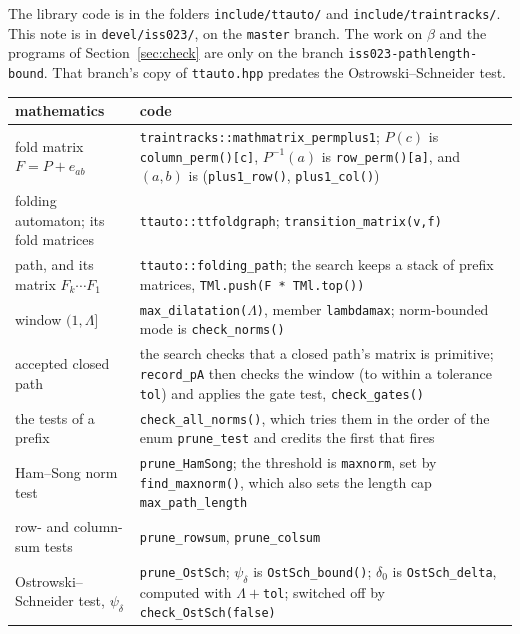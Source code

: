 \documentclass[11pt]{amsart}
\newcommand{\code}[1]{\texttt{#1}}
\newcommand{\Lam}{\Lambda}
\theoremstyle{plain}
\theoremstyle{definition}
\begin{document}
The library code is in the folders \code{include/ttauto/} and
\code{include/traintracks/}.  This note is in \code{devel/iss023/}, on
the \code{master} branch.  The work on $\beta$ and the programs of
Section~\ref{sec:check} are only on the branch
\code{iss023-pathlength-bound}.  That branch's copy of \code{ttauto.hpp}
predates the Ostrowski--Schneider test.

\begin{center}
  \small
  \begin{tabular}{>{\raggedright\arraybackslash}p{}
                  >{\raggedright\arraybackslash}p{}}
    \toprule
    mathematics & code \\
    \midrule
    fold matrix $F=P+e_{ab}$ &
      \code{traintracks::mathmatrix\_permplus1}; $P(c)$ is
      \code{column\_perm()[c]}, $P^{-1}(a)$ is \code{row\_perm()[a]}, and
      $(a,b)$ is (\code{plus1\_row()}, \code{plus1\_col()}) \\
    folding automaton; its fold matrices &
      \code{ttauto::ttfoldgraph}; \code{transition\_matrix(v,f)} \\
    path, and its matrix $F_k\cdots F_1$ &
      \code{ttauto::folding\_path}; the search keeps a stack of prefix
      matrices, \code{TMl.push(F * TMl.top())} \\
    window $(1,\Lam]$ & \code{max\_dilatation(}$\Lam$\code{)}, member
      \code{lambdamax}; norm-bounded mode is \code{check\_norms()} \\
    accepted closed path & the search checks that a closed path's matrix
      is primitive; \code{record\_pA} then checks the window (to within a
      tolerance \code{tol}) and applies the gate test,
      \code{check\_gates()} \\
    the tests of a prefix & \code{check\_all\_norms()}, which tries them in
      the order of the enum \code{prune\_test} and credits the first that
      fires \\
    Ham--Song norm test & \code{prune\_HamSong}; the threshold is
      \code{maxnorm}, set by \code{find\_maxnorm()}, which also sets the
      length cap \code{max\_path\_length} \\
    row- and column-sum tests & \code{prune\_rowsum}, \code{prune\_colsum} \\
    Ostrowski--Schneider test, $\psi_\delta$ &
      \code{prune\_OstSch}; $\psi_\delta$ is \code{OstSch\_bound()};
      $\delta_0$ is \code{OstSch\_delta}, computed with $\Lam+$\code{tol};
      switched off by \code{check\_OstSch(false)} \\

\end{tabular}
\end{center}
\end{document}

